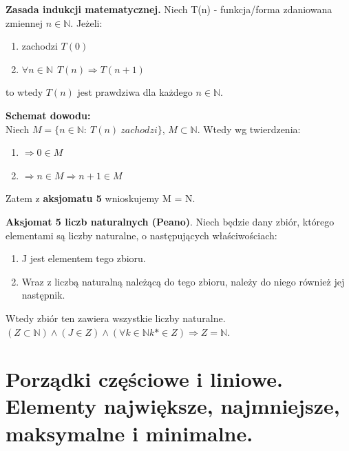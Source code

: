 \documentclass[12pt]{article}
\begin{document}
    \begin{theorem}
        \textbf{Zasada indukcji matematycznej.} Niech T(n) - funkcja/forma zdaniowana zmiennej $n \in \mathbb{N}$. Jeżeli:
        \begin{enumerate}
            \item zachodzi $T(0)$
            \item $\forall n \in \mathbb{N} ~~ T(n) \Rightarrow  T(n+1)$
        \end{enumerate}
        to wtedy $T(n)$ jest prawdziwa dla każdego $n \in \mathbb{N}$.
    \end{theorem}

    \textbf{Schemat dowodu:}\\

    Niech $M = \{ n \in \mathbb{N}: ~ T(n) ~ zachodzi \}$, $M \subset \mathbb{N}$. Wtedy wg twierdzenia:
    \begin{enumerate}
        \item $\Rightarrow 0 \in M$
        \item $\Rightarrow n \in M \Rightarrow n+1 \in M$
    \end{enumerate}
    Zatem z \textbf{aksjomatu 5} wnioskujemy M = N.

    \begin{theorem}
        \textbf{Aksjomat 5 liczb naturalnych (Peano)}. Niech będzie dany zbiór, którego elementami są liczby
        naturalne, o następujących właściwościach:
        \begin{enumerate}
            \item J jest elementem tego zbioru.
            \item Wraz z liczbą naturalną należącą do tego zbioru, należy do niego również jej następnik.
        \end{enumerate}
        Wtedy zbiór ten zawiera wszystkie liczby naturalne.
        $(Z \subset \mathbb{N}) \wedge (J \in Z) \wedge (\forall k \in \mathbb{N} k* \in Z) \Rightarrow Z = \mathbb{N}$.
    \end{theorem}

    \newpage

    \section{Porządki częściowe i liniowe. Elementy największe, najmniejsze, maksymalne i minimalne.}
\end{document}
